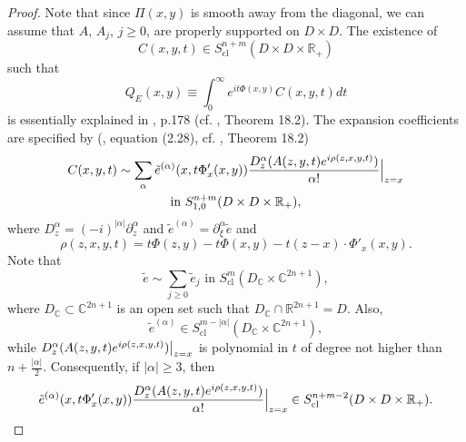 \documentclass{article}
\newcommand{\CC}{\mathbb C}
\newcommand{\RR}{\mathbb R}
\DeclareMathOperator{\cl}{cl}
\begin{document}
\begin{proof}
%
%
Note that since $\Pi(x,y)$ is smooth away from the diagonal, we can assume that $A$, $A_j$, $j \ge 0$, are properly supported on $D \times D$.
The existence of $$C(x,y,t) \in S^{n+m}_{\cl}(D \times D \times \RR_+)$$ such that $$Q_E(x,y) \equiv \int_0^\infty e^{i t \Phi(x,y)} C(x,y,t) dt$$is essentially explained in \cite{ms}, p.178 (cf. \cite{shubin}, Theorem 18.2). The expansion coefficients are specified by (\cite{ms}, equation (2.28), cf. \cite{shubin}, Theorem 18.2)
\begin{multline*} C(x,y,t) \sim \sum_\alpha \tilde e^{(\alpha)}(x, t\Phi'_x(x,y)) \frac{D_z^\alpha (A(z,y,t) e^{i \rho(z,x,y,t)})}{\alpha !} \Big{|}_{z = x}\\ \text{in }S^{n+m}_{1,0}(D \times D \times \RR_+),\end{multline*}
where $D^\alpha_z = (-i)^{|\alpha|} \partial^{\alpha}_z$ and $\tilde e^{(\alpha)} = \partial_\xi^{\alpha} \tilde e$ and $$\rho(z,x,y,t) = t\Phi(z,y) - t\Phi(x,y) - t(z-x) \cdot \Phi'_x(x,y).$$
%
Note that
\begin{equation*} \tilde e \sim \sum_{j \ge 0} \tilde e_j \text{ in } S^m_{\text{cl}}(D_{\CC}\times \CC^{2n+1}),\end{equation*}
where $D_{\CC} \subset \CC^{2n+1}$ is an open set such that $D_\CC \cap \RR^{2n+1} = D$. Also, $$\tilde e^{(\alpha)} \in S^{m-|\alpha|}_{\text{cl}}(D_\CC\times \CC^{2n+1}),$$ while $D^\alpha_z(A(z,y,t) e^{i \rho(z,x,y,t)})\big{|}_{z=x}$ is polynomial in $t$ of degree not higher than $n+\frac{|\alpha|}2$. Consequently, if $|\alpha| \ge 3$, then
\begin{equation*} \tilde e^{(\alpha)}(x, t\Phi'_x(x,y)) \frac{D^\alpha_z(A(z,y,t) e^{i \rho(z,x,y,t)})}{\alpha!}\Big{|}_{z=x} \in S^{n+m-2}_{\cl}(D \times D \times \RR_+).\end{equation*}


\end{proof}
\end{document}
